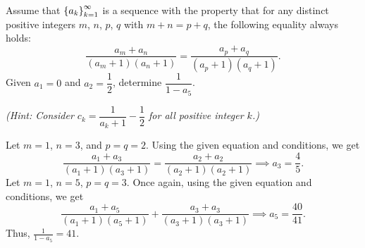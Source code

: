 \begin{question}[41]\label{A::2020-O-1-19}
    Assume that $\left\lbrace a_k \right\rbrace_{k=1}^\infty$ is a sequence with the property that for any distinct positive integers $m$, $n$, $p$, $q$ with $m + n = p + q$, the following equality always holds: \[\frac{a_m + a_n}{(a_m + 1)(a_n + 1)} = \frac{a_p + a_q}{(a_p + 1)(a_q + 1)}.\] Given $a_1 = 0$ and $a_2 = \dfrac12$, determine $\dfrac1{1 - a_5}$.

    \noindent\textit{(Hint: Consider $c_k = \dfrac{1}{a_k + 1} - \dfrac12$ for all positive integer $k$.)}
\end{question}
\begin{solution*}
    Let $m = 1$, $n = 3$, and $p = q = 2$. Using the given equation and conditions, we get \[\frac{a_1 + a_3}{(a_1 + 1)(a_3 + 1)} = \frac{a_2 + a_2}{(a_2 + 1)(a_2 + 1)} \implies a_3 = \frac45.\] Let $m = 1$, $n = 5$, $p = q = 3$. Once again, using the given equation and conditions, we get \[\frac{a_1 + a_5}{(a_1 + 1)(a_5 + 1)} + \frac{a_3 + a_3}{(a_3 + 1)(a_3 + 1)} \implies a_5 = \frac{40}{41}.\] Thus, $\frac{1}{1 - a_5} = 41$.
\end{solution*}

